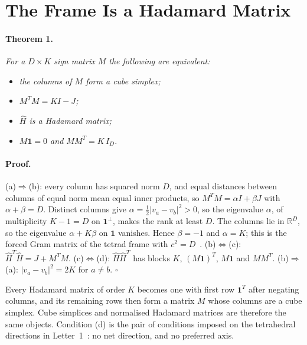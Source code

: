 \documentclass[twocolumn]{iopjournal}
\begin{document}

\section*{The Frame Is a Hadamard Matrix}

\paragraph{Theorem 1.} \textit{For a $D \times K$ sign matrix $M$
the following are equivalent:}
\begin{itemize}
\item[(a)] \textit{the columns of $M$ form a cube simplex;}
\item[(b)] \textit{$M^TM = KI - J$;}
\item[(c)] \textit{$\hat H$ is a Hadamard matrix;}
\item[(d)] \textit{$M\mathbf{1} = 0$ and $MM^T = K\,I_D$.}
\end{itemize}

\paragraph{Proof.} (a)$\Rightarrow$(b): every column has squared
norm $D$, and equal distances between columns of equal norm mean
equal inner products, so $M^TM = \alpha I + \beta J$ with
$\alpha + \beta = D$. Distinct columns give
$\alpha = \tfrac12|v_a - v_b|^2 > 0$, so the eigenvalue $\alpha$,
of multiplicity $K - 1 = D$ on $\mathbf{1}^\perp$, makes the rank
at least $D$. The columns lie in $\mathbb{R}^D$, so the eigenvalue
$\alpha + K\beta$ on $\mathbf{1}$ vanishes. Hence $\beta = -1$ and
$\alpha = K$; this is the forced Gram matrix of the tetrad frame
with $c^2 = D$~\cite{Nelson2026frame}. (b)$\Leftrightarrow$(c):
$\hat H^T\hat H = J + M^TM$. (c)$\Leftrightarrow$(d):
$\hat H\hat H^T$ has blocks $K$, $(M\mathbf{1})^T$, $M\mathbf{1}$
and $MM^T$. (b)$\Rightarrow$(a):
$|v_a - v_b|^2 = 2K$ for $a \neq b$. \hfill $\square$

\medskip
\noindent
Every Hadamard matrix of order $K$ becomes one with first row
$\mathbf{1}^T$ after negating columns, and its remaining rows then
form a matrix $M$ whose columns are a cube simplex. Cube simplices and normalised Hadamard
matrices are therefore the same objects. Condition (d) is the pair
of conditions imposed on the tetrahedral directions in
Letter~1~\cite{Nelson2026signature}: no net direction, and no
preferred axis.
\end{document}
